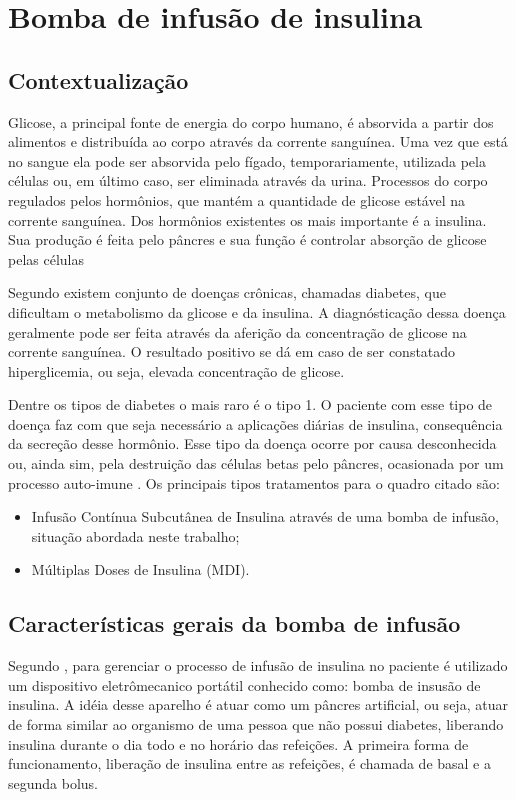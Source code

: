 \chapter{Bomba de infusão de insulina}
\section{Contextualização}
Glicose, a principal fonte de energia do corpo humano, é absorvida a partir dos alimentos e distribuída ao corpo através da corrente sanguínea. Uma vez que está no sangue ela pode ser absorvida pelo fígado, temporariamente, utilizada pela células ou, em último caso, ser eliminada através da urina. Processos do corpo regulados pelos hormônios, que mantém a quantidade de glicose estável na corrente sanguínea. Dos hormônios existentes os mais importante é a insulina. Sua produção é feita pelo pâncres e sua função é controlar absorção de glicose pelas células \cite{sbc2014}

Segundo \cite{sbc2014} existem conjunto de doenças crônicas, chamadas diabetes, que dificultam o metabolismo da glicose e da insulina. A diagnósticação dessa doença geralmente pode ser feita através da aferição da concentração de glicose na corrente sanguínea. O resultado positivo se dá em caso de ser constatado hiperglicemia, ou seja, elevada concentração de glicose.

Dentre os tipos de diabetes o mais raro é o tipo 1. O paciente com esse tipo de doença faz com que seja necessário a aplicações diárias de insulina, consequência da secreção desse hormônio. Esse tipo da doença ocorre por causa desconhecida ou, ainda sim, pela destruição das células betas pelo pâncres, ocasionada por um processo auto-imune \cite{galvao2013requirements}. Os principais tipos tratamentos para o quadro citado são:
\begin{itemize}
\item Infusão Contínua Subcutânea de Insulina através de uma bomba de infusão, situação abordada neste trabalho;
\item Múltiplas Doses de Insulina (MDI).
\end{itemize}

\section{Características gerais da bomba de infusão}
Segundo \cite{minicucci2008uso}, para gerenciar o processo de infusão de insulina no paciente é utilizado um dispositivo eletrômecanico portátil conhecido como: bomba de insusão de insulina. A idéia desse aparelho é atuar como um pâncres artificial, ou seja, atuar de forma similar ao organismo de uma pessoa que não possui diabetes, liberando insulina durante o dia todo e no horário das refeições. A primeira forma de funcionamento, liberação de insulina entre as refeições, é chamada de basal e a segunda bolus.

